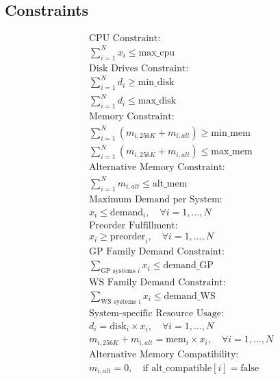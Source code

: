 \documentclass{article}
\begin{document}
\subsection*{Constraints}
\begin{align*}
& \text{CPU Constraint:} \\
& \sum_{i=1}^{N} x_i \leq \text{max\_cpu} \\

& \text{Disk Drives Constraint:} \\
& \sum_{i=1}^{N} d_i \geq \text{min\_disk} \\
& \sum_{i=1}^{N} d_i \leq \text{max\_disk} \\

& \text{Memory Constraint:} \\
& \sum_{i=1}^{N} (m_{i,256K} + m_{i,alt}) \geq \text{min\_mem} \\
& \sum_{i=1}^{N} (m_{i,256K} + m_{i,alt}) \leq \text{max\_mem} \\

& \text{Alternative Memory Constraint:} \\
& \sum_{i=1}^{N} m_{i,alt} \leq \text{alt\_mem} \\

& \text{Maximum Demand per System:} \\
& x_i \leq \text{demand}_i, \quad \forall i = 1, \ldots, N \\

& \text{Preorder Fulfillment:} \\
& x_i \geq \text{preorder}_i, \quad \forall i = 1, \ldots, N \\

& \text{GP Family Demand Constraint:} \\
& \sum_{\text{GP systems } i} x_i \leq \text{demand\_GP} \\

& \text{WS Family Demand Constraint:} \\
& \sum_{\text{WS systems } i} x_i \leq \text{demand\_WS} \\

& \text{System-specific Resource Usage:} \\
& d_i = \text{disk}_i \times x_i, \quad \forall i = 1, \ldots, N \\
& m_{i,256K} + m_{i,alt} = \text{mem}_i \times x_i, \quad \forall i = 1, \ldots, N \\

& \text{Alternative Memory Compatibility:} \\
& m_{i,alt} = 0, \quad \text{if } \text{alt\_compatible}[i] = \text{false}
\end{align*}
\end{document}
